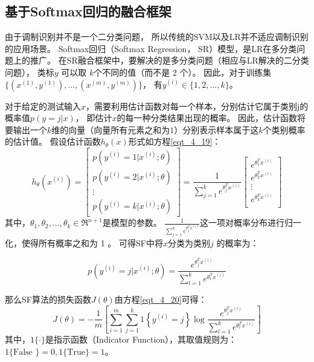 \subsection{基于Softmax回归的融合框架}

由于调制识别并不是一个二分类问题，
所以传统的SVM以及LR并不适应调制识别的应用场景。
Softmax回归（Softmax Regression， SR）模型，是LR在多分类问题上的推广。
在SR融合框架中，要解决的是多分类问题（相应与LR解决的二分类问题），
类标$y$ 可以取 $k$个不同的值（而不是 2 个）。
因此，对于训练集 $\{ (x^{(1)}, y^{(1)}), \dots, (x^{(m)}, y^{(m)}) \}$，
有$y^{(i)} \in \{1, 2, \dots, k\}$。\par

对于给定的测试输入$x$，需要利用估计函数对每一个样本，分别估计它属于类别j的概率值$p(y=j | x)$，
即估计$x$的每一种分类结果出现的概率。
因此，估计函数将要输出一个$k$维的向量（向量所有元素之和为$1$）分别表示样本属于这$k$个类别概率的估计值。
假设估计函数$h_{\theta}(x)$形式如方程\eqref{eqt_4_19}：
\begin{equation}
\label{eqt_4_19}
		h_\theta(x^{(i)}) =
		\begin{bmatrix}
			p(y^{(i)} = 1 | x^{(i)}; \theta) \\
			p(y^{(i)} = 2 | x^{(i)}; \theta) \\
			\vdots \\
			p(y^{(i)} = k | x^{(i)}; \theta)
		\end{bmatrix}
			=
			\frac{1}{ \sum_{j=1}^{k}{e^{ \theta_j^T x^{(i)} }} }
			\begin{bmatrix}
			e^{ \theta_1^T x^{(i)} } \\
			e^{ \theta_2^T x^{(i)} } \\
			\vdots \\
			e^{ \theta_k^T x^{(i)} } \\
			\end{bmatrix}
\end{equation}
其中，$\theta_1, \theta_2, \ldots, \theta_k \in \Re^{n+1}$是模型的参数。
$\frac{1}{ \sum_{j=1}^{k}{e^{ \theta_j^T x^{(i)} }} }$这一项对概率分布进行归一化，使得所有概率之和为 1 。
可得SF中将$x$分类为类别$j$ 的概率为：\par
\begin{equation}
p(y^{(i)} = j | x^{(i)} ; \theta) = \frac{e^{\theta_j^T x^{(i)}}}{\sum_{l=1}^k e^{ \theta_l^T x^{(i)}} }
\end{equation}

那么SF算法的损失函数$J(\theta)$由方程\eqref{eqt_4_20}可得：
\begin{equation}
	\label{eqt_4_20}
	J(\theta) = - \frac{1}{m} \left[ \sum_{i=1}^{m} \sum_{j=1}^{k}  1\left\{y^{(i)} = j\right\} \log \frac{e^{\theta_j^T x^{(i)}}}{\sum_{l=1}^k e^{ \theta_l^T x^{(i)} }}\right]
\end{equation}
其中，$1\{\cdot\}$是指示函数（Indicator Function），其取值规则为：$1\{ \text{False }\}=0, 1\{ \text{True} \}=1$。\par


